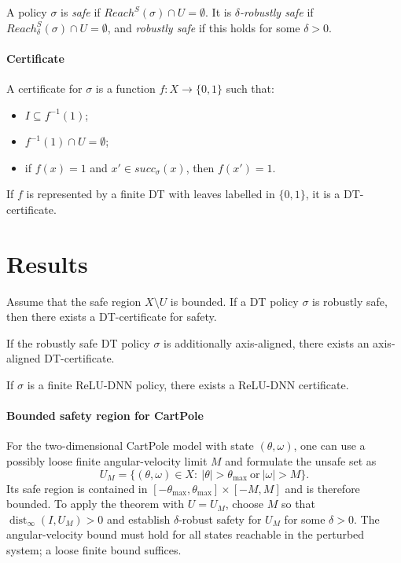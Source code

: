 \documentclass[runningheads]{llncs}
\begin{document}
A policy $\sigma$ is \emph{safe} if $Reach^S(\sigma)\cap U=\emptyset$.
It is \emph{$\delta$-robustly safe} if $Reach^S_\delta(\sigma)\cap U=\emptyset$, and \emph{robustly safe} if this holds for some $\delta>0$.

\paragraph{Certificate}
\begin{definition}
A certificate for $\sigma$ is a function $f:X\rightarrow\{0,1\}$ such that:
\begin{itemize}
\item $I\subseteq f^{-1}(1)$;
\item $f^{-1}(1)\cap U=\emptyset$;
\item if $f(x)=1$ and $x'\in succ_\sigma(x)$, then $f(x')=1$.
\end{itemize}
If $f$ is represented by a finite DT with leaves labelled in $\{0,1\}$, it is a DT-certificate.

\end{definition}

\section{Results}

\begin{theorem}
Assume that the safe region {\color{red} $X\setminus U$ is bounded}.
If a DT policy $\sigma$ is robustly safe, then there exists a DT-certificate for safety.

If the robustly safe DT policy $\sigma$ is additionally axis-aligned, there exists an axis-aligned DT-certificate.

If $\sigma$ is a finite ReLU-DNN policy, there exists a ReLU-DNN certificate.
\end{theorem}

\paragraph{Bounded safety region for CartPole}
For the two-dimensional CartPole model with state $(\theta,\omega)$, one can use a possibly loose finite angular-velocity limit $M$ and formulate the unsafe set as
\[
U_M=\{(\theta,\omega)\in X:\ |\theta|>\theta_{\max}\ \text{or}\ |\omega|>M\}.
\]
Its safe region is contained in $[-\theta_{\max},\theta_{\max}]\times[-M,M]$ and is therefore bounded.
To apply the theorem with $U=U_M$, choose $M$ so that $\operatorname{dist}_\infty(I,U_M)>0$ and establish $\delta$-robust safety for $U_M$ for some $\delta>0$.
The angular-velocity bound must hold for all states reachable in the perturbed system; a loose finite bound suffices.
\end{document}
